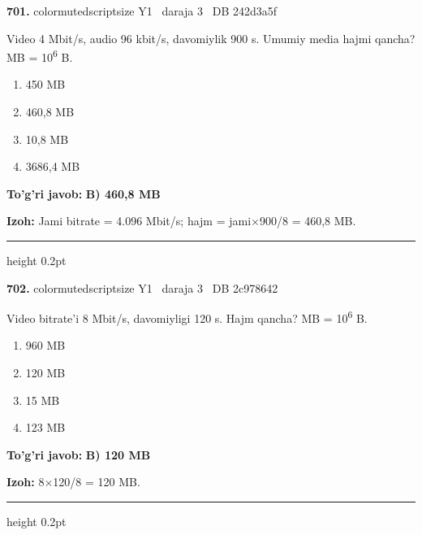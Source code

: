 \documentclass[10pt,a4paper,oneside]{article}
\begin{document}
\noindent\textbf{\color{ink}701.}  {color{muted}scriptsize Y1 \textbullet\ daraja 3 \textbullet\ DB 242d3a5f}
\par
Video 4 Mbit/s, audio 96 kbit/s, davomiylik 900 s. Umumiy media hajmi qancha? MB = 10\textsuperscript{6} B.
\begin{enumerate}[label=\Alph*),leftmargin=9mm]
\item 450 MB
\item 460,8 MB
\item 10,8 MB
\item 3686,4 MB
\end{enumerate}
\begin{tcolorbox}[enhanced,breakable,colback=teal!4,colframe=teal!50!black,boxrule=0.5pt,arc=1.1mm,left=3mm,right=3mm,top=1.7mm,bottom=1.7mm,before skip=2mm,after skip=2mm]
\textbf{\color{teal}To'g'ri javob:} \textbf{B) 460,8 MB}
\par\smallskip
\textbf{Izoh:} Jami bitrate = 4.096 Mbit/s; hajm = jami\ensuremath{\times}900/8 = 460,8 MB.
\end{tcolorbox}
\vspace{2mm}\hrule height 0.2pt \vspace{3mm}

\noindent\textbf{\color{ink}702.}  {color{muted}scriptsize Y1 \textbullet\ daraja 3 \textbullet\ DB 2c978642}
\par
Video bitrate'i 8 Mbit/s, davomiyligi 120 s. Hajm qancha? MB = 10\textsuperscript{6} B.
\begin{enumerate}[label=\Alph*),leftmargin=9mm]
\item 960 MB
\item 120 MB
\item 15 MB
\item 123 MB
\end{enumerate}
\begin{tcolorbox}[enhanced,breakable,colback=teal!4,colframe=teal!50!black,boxrule=0.5pt,arc=1.1mm,left=3mm,right=3mm,top=1.7mm,bottom=1.7mm,before skip=2mm,after skip=2mm]
\textbf{\color{teal}To'g'ri javob:} \textbf{B) 120 MB}
\par\smallskip
\textbf{Izoh:} 8\ensuremath{\times}120/8 = 120 MB.
\end{tcolorbox}
\vspace{2mm}\hrule height 0.2pt \vspace{3mm}
\end{document}
